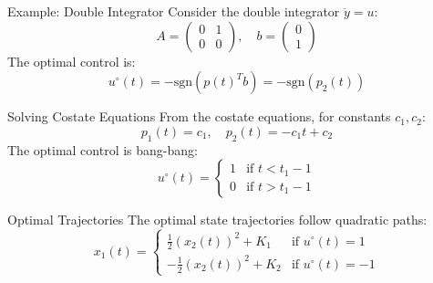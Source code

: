 \documentclass[10pt]{beamer}
\begin{document}
\begin{frame}[fragile]{Example: Double Integrator}
  Consider the double integrator \( \ddot{y} = u \):
  \[
  A = \begin{pmatrix} 0 & 1 \\ 0 & 0 \end{pmatrix}, \quad b = \begin{pmatrix} 0 \\ 1 \end{pmatrix}
  \]
  The optimal control is:
  \[
  u^\circ(t) = -\text{sgn}(p(t)^T b) = -\text{sgn}(p_2(t))
  \]
\end{frame}
  
\begin{frame}[fragile]{Solving Costate Equations}
  From the costate equations, for constants \( c_1, c_2 \):
  \[
  p_1(t) = c_1, \quad p_2(t) = -c_1 t + c_2
  \]
  The optimal control is bang-bang:
  \[
  u^\circ(t) = \begin{cases}
  1 & \text{if } t < t_1 - 1 \\
  0 & \text{if } t > t_1 - 1
  \end{cases}
  \]
\end{frame}
  
\begin{frame}[fragile]{Optimal Trajectories}
  The optimal state trajectories follow quadratic paths:
  \[
  x_1(t) = \begin{cases}
  \frac{1}{2} (x_2(t))^2 + K_1 & \text{if } u^\circ(t) = 1 \\
  -\frac{1}{2} (x_2(t))^2 + K_2 & \text{if } u^\circ(t) = -1
  \end{cases}
  \]
\end{frame}
\end{document}
